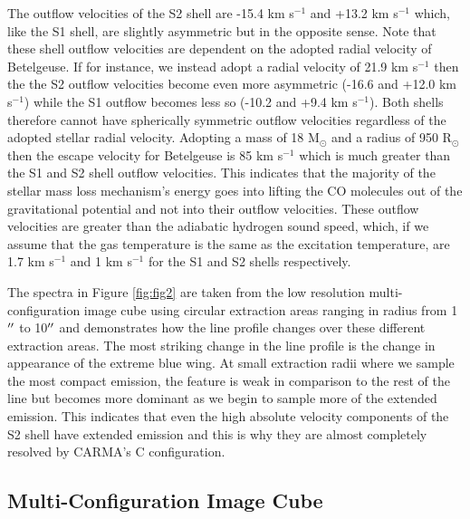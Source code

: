 \documentclass[iop]{emulateapj}
\begin{document}
The outflow velocities of the S2 shell are -15.4 km s${}^{-1}$ and +13.2 km s${}^{-1}$ which, like the S1 shell, are slightly asymmetric but in the opposite sense. Note that these shell outflow velocities are dependent on the adopted radial velocity of Betelgeuse. If for instance, we instead adopt a radial velocity of 21.9 km s${}^{-1}$ \citep{2005A&A...430..165F} then the the S2 outflow velocities become even more asymmetric (-16.6 and +12.0 km s${}^{-1}$) while the S1 outflow becomes less so (-10.2 and +9.4 km s${}^{-1}$). Both shells therefore cannot have spherically symmetric outflow velocities regardless of the adopted stellar radial velocity. Adopting a mass of 18 M$_{\odot}$ and a radius of 950 R$_{\odot}$ \citep{2008AJ....135.1430H} then the escape velocity for Betelgeuse is 85 km s${}^{-1}$ which is much greater than the S1 and S2 shell outflow velocities. This indicates that the majority of the stellar mass loss mechanism's energy goes into lifting the CO molecules out of the gravitational potential and not into their outflow velocities. These outflow velocities are greater than the adiabatic hydrogen sound speed, which, if we assume that the gas temperature is the same as the excitation temperature, are 1.7 km s${}^{-1}$ and 1 km s${}^{-1}$ for the S1 and S2 shells respectively. 

The spectra in Figure \ref{fig:fig2} are taken from the low resolution multi-configuration image cube using circular extraction areas ranging in radius from 1$\mbox{$^{\prime\prime}$}$ to 10$\mbox{$^{\prime\prime}$}$ and demonstrates how the line profile changes over these different extraction areas. The most striking change in the line profile is the change in appearance of the extreme blue wing. At small extraction radii where we sample the most compact emission, the feature is weak in comparison to the rest of the line but becomes more dominant as we begin to sample more of the extended emission. This indicates that even the high absolute velocity components of the S2 shell have extended emission and this is why they are almost completely resolved by CARMA's C configuration.

\subsection{Multi-Configuration Image Cube} \label{results2} 
\end{document}
